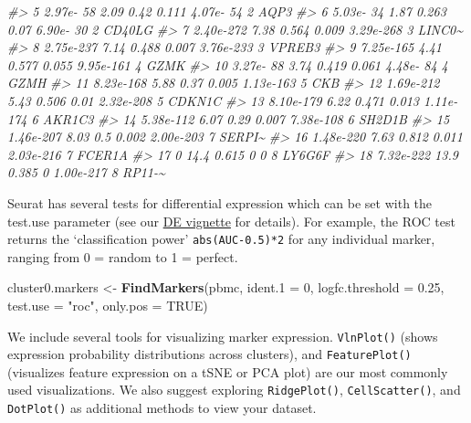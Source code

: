 \documentclass[
]{book}
\newenvironment{Shaded}{\begin{snugshade}}{\end{snugshade}}
\newcommand{\AttributeTok}[1]{\textcolor[rgb]{0.13,0.29,0.53}{#1}}
\newcommand{\CommentTok}[1]{\textcolor[rgb]{0.56,0.35,0.01}{\textit{#1}}}
\newcommand{\ConstantTok}[1]{\textcolor[rgb]{0.56,0.35,0.01}{#1}}
\newcommand{\DecValTok}[1]{\textcolor[rgb]{0.00,0.00,0.81}{#1}}
\newcommand{\FloatTok}[1]{\textcolor[rgb]{0.00,0.00,0.81}{#1}}
\newcommand{\FunctionTok}[1]{\textcolor[rgb]{0.13,0.29,0.53}{\textbf{#1}}}
\newcommand{\NormalTok}[1]{#1}
\newcommand{\OtherTok}[1]{\textcolor[rgb]{0.56,0.35,0.01}{#1}}
\newcommand{\StringTok}[1]{\textcolor[rgb]{0.31,0.60,0.02}{#1}}
\begin{document}
\begin{Shaded}
\begin{Highlighting}[]
\CommentTok{\#\textgreater{}  5 2.97e{-} 58       2.09 0.42  0.111 4.07e{-} 54 2       AQP3  }
\CommentTok{\#\textgreater{}  6 5.03e{-} 34       1.87 0.263 0.07  6.90e{-} 30 2       CD40LG}
\CommentTok{\#\textgreater{}  7 2.40e{-}272       7.38 0.564 0.009 3.29e{-}268 3       LINC0\textasciitilde{}}
\CommentTok{\#\textgreater{}  8 2.75e{-}237       7.14 0.488 0.007 3.76e{-}233 3       VPREB3}
\CommentTok{\#\textgreater{}  9 7.25e{-}165       4.41 0.577 0.055 9.95e{-}161 4       GZMK  }
\CommentTok{\#\textgreater{} 10 3.27e{-} 88       3.74 0.419 0.061 4.48e{-} 84 4       GZMH  }
\CommentTok{\#\textgreater{} 11 8.23e{-}168       5.88 0.37  0.005 1.13e{-}163 5       CKB   }
\CommentTok{\#\textgreater{} 12 1.69e{-}212       5.43 0.506 0.01  2.32e{-}208 5       CDKN1C}
\CommentTok{\#\textgreater{} 13 8.10e{-}179       6.22 0.471 0.013 1.11e{-}174 6       AKR1C3}
\CommentTok{\#\textgreater{} 14 5.38e{-}112       6.07 0.29  0.007 7.38e{-}108 6       SH2D1B}
\CommentTok{\#\textgreater{} 15 1.46e{-}207       8.03 0.5   0.002 2.00e{-}203 7       SERPI\textasciitilde{}}
\CommentTok{\#\textgreater{} 16 1.48e{-}220       7.63 0.812 0.011 2.03e{-}216 7       FCER1A}
\CommentTok{\#\textgreater{} 17 0              14.4  0.615 0     0         8       LY6G6F}
\CommentTok{\#\textgreater{} 18 7.32e{-}222      13.9  0.385 0     1.00e{-}217 8       RP11{-}\textasciitilde{}}
\end{Highlighting}
\end{Shaded}

Seurat has several tests for differential expression which can be set with the test.use parameter (see our \href{de_vignette.html}{DE vignette} for details). For example, the ROC test returns the `classification power' \texttt{abs(AUC-0.5)*2} for any individual marker, ranging from 0 = random to 1 = perfect.

\begin{Shaded}
\begin{Highlighting}[]
\NormalTok{cluster0.markers }\OtherTok{\textless{}{-}} \FunctionTok{FindMarkers}\NormalTok{(pbmc, }\AttributeTok{ident.1 =} \DecValTok{0}\NormalTok{, }\AttributeTok{logfc.threshold =} \FloatTok{0.25}\NormalTok{, }\AttributeTok{test.use =} \StringTok{"roc"}\NormalTok{, }\AttributeTok{only.pos =} \ConstantTok{TRUE}\NormalTok{)}
\end{Highlighting}
\end{Shaded}

We include several tools for visualizing marker expression. \texttt{VlnPlot()} (shows expression probability distributions across clusters), and \texttt{FeaturePlot()} (visualizes feature expression on a tSNE or PCA plot) are our most commonly used visualizations. We also suggest exploring \texttt{RidgePlot()}, \texttt{CellScatter()}, and \texttt{DotPlot()} as additional methods to view your dataset.
\end{document}
